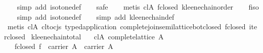 \begin{isabellebody}
%
\isadelimproof
\ \ %
\endisadelimproof
%
\isatagproof
{}\isamarkupfalse%
\ {}simp\ add{}\ isotone{}def{}\isanewline
\ \ \isamarkupfalse%
\ safe\isanewline
\ \ \isamarkupfalse%
\ {}metis\ cl{}A\ f{}closed\ kleene{}chain{}order{}\isanewline
\ \ \isamarkupfalse%
\ f{}iso\isanewline
\ \ \isamarkupfalse%
\ {}simp\ add{}\ isotone{}def{}\isanewline
\ \ \isamarkupfalse%
\ {}simp\ add{}\ kleene{}chain{}def{}\isanewline
\ \ \isamarkupfalse%
\ {}metis\ cl{}A\ cl{}to{}cjs\ typed{}application\ complete{}join{}semilattice{}bot{}closed\ f{}closed\ iter{}closed{}%
\endisatagproof
{\isafoldproof}%
%
\isadelimproof
\isanewline
%
\endisadelimproof
\isanewline
{}\isamarkupfalse%
\ kleene{}chain{}total{}\isanewline
\ \ \ cl{}A{}\ {}complete{}lattice\ A{}\isanewline
\ \ \ f{}closed{}\ {}f\ {}\ carrier\ A\ {}\ carrier\ A{}\isanewline

\end{isabellebody}
